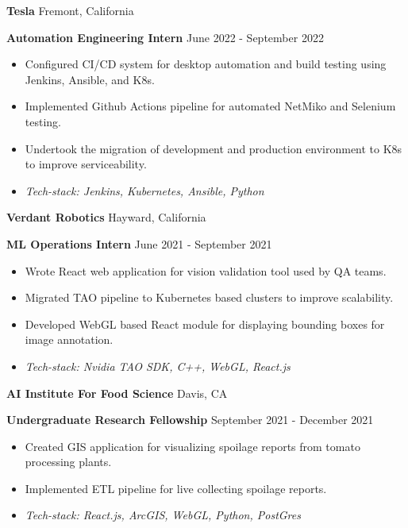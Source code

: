 \documentclass[11pt]{article}
\begin{document}
\vspace{8pt}

\textbf{Tesla} \hfill Fremont, California

\textbf{Automation Engineering Intern} \hfill June 2022 - September 2022
\begin{itemize}[noitemsep, topsep=0pt, partopsep=0pt, parsep=0pt]
    \item Configured CI/CD system for desktop automation and build testing using Jenkins, Ansible, and K8s.
    \item Implemented Github Actions pipeline for automated NetMiko and Selenium testing.
    \item Undertook the migration of development and production environment to K8s to improve serviceability.
    \item \textit{Tech-stack: Jenkins, Kubernetes, Ansible, Python}
\end{itemize}

\vspace{8pt}

\textbf{Verdant Robotics} \hfill Hayward, California

\textbf{ML Operations Intern} \hfill June 2021 - September 2021 
\begin{itemize}[noitemsep, topsep=0pt, partopsep=0pt, parsep=0pt]
    \item Wrote React web application for vision validation tool used by QA teams.
    \item Migrated TAO pipeline to Kubernetes based clusters to improve scalability.
    \item Developed WebGL based React module for displaying bounding boxes for image annotation.
    \item \textit{Tech-stack: Nvidia TAO SDK, C++, WebGL, React.js}
\end{itemize}

\vspace{8pt}

\textbf{AI Institute For Food Science}	\hfill Davis, CA

\textbf{Undergraduate Research Fellowship} \hfill September 2021 - December 2021
\begin{itemize}[noitemsep, topsep=0pt, partopsep=0pt, parsep=0pt]
    \item Created GIS application for visualizing spoilage reports from tomato processing plants.
    \item Implemented ETL pipeline for live collecting spoilage reports.
    \item \textit{Tech-stack: React.js, ArcGIS, WebGL, Python, PostGres}
\end{itemize}
\end{document}
